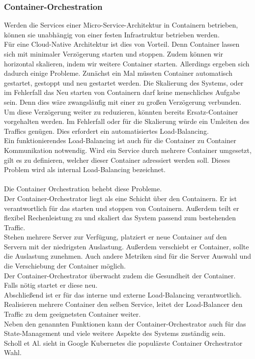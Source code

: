 \subsubsection{Container-Orchestration}
Werden die Services einer Micro-Service-Architektur in Containern betrieben, können sie unabhängig von einer festen Infrastruktur betrieben werden.\\
Für eine Cloud-Native Architektur ist dies von Vorteil. Denn Container lassen sich mit minimaler Verzögerung starten und stoppen. Zudem können wir horizontal skalieren, indem wir weitere Container starten. Allerdings ergeben sich dadurch einige Probleme. Zunächst ein Mal müssten Container automatisch gestartet, gestoppt und neu gestartet werden. Die Skalierung des Systems, oder im Fehlerfall das Neu starten von Containern darf keine menschliches Aufgabe sein. Denn dies wäre zwangsläufig mit einer zu großen Verzögerung verbunden.\\
Um diese Verzögerung weiter zu reduzieren, könnten bereits Ersatz-Container vorgehalten werden. Im Fehlerfall oder für die Skalierung würde ein Umleiten des Traffics genügen. Dies erfordert ein automatisiertes Load-Balancing.\\
Ein funktionierendes Load-Balancing ist auch für die Container zu Container Kommunikation notwendig. Wird ein Service durch mehrere Container umgesetzt, gilt es zu definieren, welcher dieser Container adressiert werden soll. Dieses Problem wird als internal Load-Balancing bezeichnet. \\\\

Die Container Orchestration behebt diese Probleme.\\
Der Container-Orchestrator liegt als eine Schicht über den Containern. Er ist verantwortlich für das starten und stoppen von Containern. Außerdem teilt er flexibel Rechenleistung zu und skaliert das System passend zum bestehenden Traffic.\\
Stehen mehrere Server zur Verfügung, platziert er neue Container auf den Servern mit der niedrigsten Auslastung. Außerdem verschiebt er Container, sollte die Auslastung zunehmen. Auch andere Metriken sind für die Server Auswahl und die Verschiebung der Container möglich.\\
Der Container-Orchestrator überwacht zudem die Gesundheit der Container. Falls nötig startet er diese neu.\\
Abschließend ist er für das interne und externe Load-Balancing verantwortlich. Realisieren mehrere Container den selben Service, leitet der Load-Balancer den Traffic zu dem geeignetsten Container weiter. \\
Neben den genannten Funktionen kann der Container-Orchestrator auch für das State-Management und viele weitere Aspekte des Systems zuständig sein.\\
Scholl et Al.\cite{scholl_cloud_2019} sieht in Google Kubernetes die populärste Container Orchestrator Wahl.
